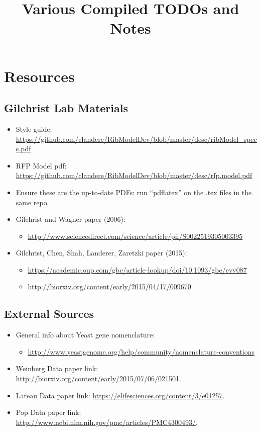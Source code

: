 \documentclass[letter,10pt]{article}
\title{Various Compiled TODOs and Notes}
\begin{document}
\maketitle
\newpage
\tableofcontents
\newpage

\section{Resources}

\subsection{Gilchrist Lab Materials}
\begin{itemize}
    \item Style guide: \url{https://github.com/clandere/RibModelDev/blob/master/desc/ribModel_specs.pdf}
    \item RFP Model pdf: \url{https://github.com/clandere/RibModelDev/blob/master/desc/rfp.model.pdf}
    \item Ensure these are the up-to-date PDFs: run \enquote{pdflatex} on the .tex files in the same repo.
    \item Gilchrist and Wagner paper (2006):
    \begin{itemize}
        \item \url{http://www.sciencedirect.com/science/article/pii/S0022519305003395}
    \end{itemize}
    \item Gilchrist, Chen, Shah, Landerer, Zaretzki paper (2015):
    \begin{itemize}
        \item \url{https://academic.oup.com/gbe/article-lookup/doi/10.1093/gbe/evv087}
        \item \url{http://biorxiv.org/content/early/2015/04/17/009670}
    \end{itemize}
\end{itemize}

\subsection{External Sources}
\begin{itemize}
    \item General info about Yeast gene nomenclature:
    \begin{itemize}
        \item \url{http://www.yeastgenome.org/help/community/nomenclature-conventions}
    \end{itemize}
    \item Weinberg Data paper link: \url{http://biorxiv.org/content/early/2015/07/06/021501}.
    \item Lareau Data paper link: \url{https://elifesciences.org/content/3/e01257}.
    \item Pop Data paper link: \url{http://www.ncbi.nlm.nih.gov/pmc/articles/PMC4300493/}.
\end{itemize}
\end{document}
